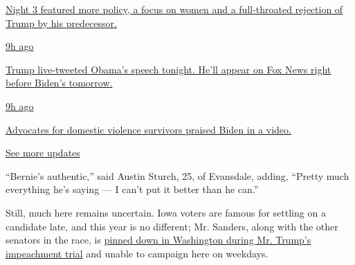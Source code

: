 \href{https://www.nytimes3xbfgragh.onion/live/2020/08/19/us/dnc-convention-election?action=click\&pgtype=Article\&state=default\&region=MAIN_CONTENT_1\&context=storylines_live_updates\#night-3-featured-more-policy-a-focus-on-women-and-a-full-throated-rejection-of-trump-by-his-predecessor}{Night
3 featured more policy, a focus on women and a full-throated rejection
of Trump by his predecessor.}

\href{https://www.nytimes3xbfgragh.onion/live/2020/08/19/us/dnc-convention-election?action=click\&pgtype=Article\&state=default\&region=MAIN_CONTENT_1\&context=storylines_live_updates\#trump-live-tweeted-obamas-speech-tonight-hell-appear-on-fox-news-right-before-bidens-tomorrow}{9h
ago}

\href{https://www.nytimes3xbfgragh.onion/live/2020/08/19/us/dnc-convention-election?action=click\&pgtype=Article\&state=default\&region=MAIN_CONTENT_1\&context=storylines_live_updates\#trump-live-tweeted-obamas-speech-tonight-hell-appear-on-fox-news-right-before-bidens-tomorrow}{Trump
live-tweeted Obama's speech tonight. He'll appear on Fox News right
before Biden's tomorrow.}

\href{https://www.nytimes3xbfgragh.onion/live/2020/08/19/us/dnc-convention-election?action=click\&pgtype=Article\&state=default\&region=MAIN_CONTENT_1\&context=storylines_live_updates\#advocates-for-domestic-violence-survivors-praised-biden-in-a-video}{9h
ago}

\href{https://www.nytimes3xbfgragh.onion/live/2020/08/19/us/dnc-convention-election?action=click\&pgtype=Article\&state=default\&region=MAIN_CONTENT_1\&context=storylines_live_updates\#advocates-for-domestic-violence-survivors-praised-biden-in-a-video}{Advocates
for domestic violence survivors praised Biden in a video.}

\href{https://www.nytimes3xbfgragh.onion/live/2020/08/19/us/dnc-convention-election?action=click\&pgtype=Article\&state=default\&region=MAIN_CONTENT_1\&context=storylines_live_updates}{See
more updates}

``Bernie's authentic,'' said Austin Sturch, 25, of Evansdale, adding,
``Pretty much everything he's saying --- I can't put it better than he
can.''

Still, much here remains uncertain. Iowa voters are famous for settling
on a candidate late, and this year is no different; Mr. Sanders, along
with the other senators in the race, is
\href{https://www.nytimes3xbfgragh.onion/2020/01/22/us/politics/trump-impeachment-democratic-candidates.html}{pinned
down in Washington during Mr. Trump's impeachment trial} and unable to
campaign here on weekdays.

